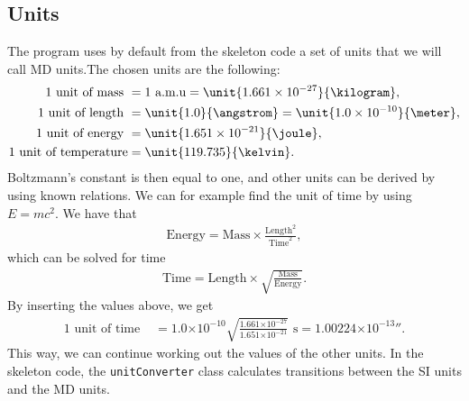 \documentclass[11pt,a4wide]{article}
\providecommand{\e}[1]{\ensuremath{\times 10^{#1}}}
\begin{document}
\newpage
\begin{appendices}
\section{Units}
\label{sec:units}
The program uses by default from the skeleton code a set of units that we will call MD units.The chosen units are the following:
\begin{align}
	\text{1 unit of mass } &= 1 \text{ a.m.u} = \unit{1.661\e{-27}}{\kilogram},\\
	\text{1 unit of length } &= \unit{1.0}{\angstrom} = \unit{1.0\e{-10}}{\meter},\\
	\text{1 unit of energy } &= \unit{1.651\e{-21}}{\joule},\\
	\text{1 unit of temperature} &= \unit{119.735}{\kelvin}.
\end{align}
Boltzmann's constant is then equal to one, and other units can be derived by using known relations. We can for example find the unit of time by using $E=mc^2$. We have that
\begin{align}
	\text{Energy} = \text{Mass} \times \frac{\text{Length}^2}{\text{Time}^2},
\end{align}
which can be solved for time
\begin{align}
	\text{Time} = \text{Length} \times \sqrt{\frac{\text{Mass}}{\text{Energy}}}.
\end{align}
By inserting the values above, we get 
\begin{align}
	\text{1 unit of time } &= 1.0 \e{-10}\sqrt{\frac{1.661\e{-27}}{1.651\e{-21}}} \text{ s} = \unit{1.00224\e{-13}}{\second}.
\end{align}
This way, we can continue working out the values of the other units. In the skeleton code, the \texttt{unitConverter} class calculates transitions between the SI units and the MD units.
\end{appendices}
\end{document}
